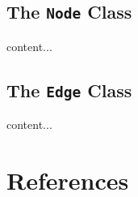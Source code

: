 \documentclass{beamer}
\begin{document}
\subsection{The {\tt Node} Class}
\begin{frame}
content...
\end{frame}
\subsection{The {\tt Edge} Class}
\begin{frame}
content...
\end{frame}


\section{References}
\begin{frame}[allowframebreaks]
\nocite{*}
\printbibliography
\end{frame}
\end{document}
